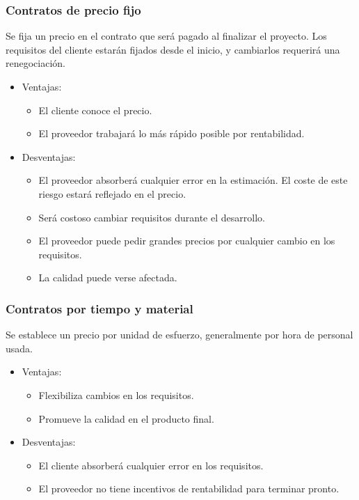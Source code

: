\documentclass[12pt]{article}
\begin{document}
\subsubsection{Contratos de precio fijo}
\label{10.2.1}

{Se fija un precio en el contrato que será pagado al finalizar el proyecto. Los requisitos del cliente estarán fijados desde el inicio, y cambiarlos requerirá una renegociación.}

\begin{itemize}
    \item Ventajas:
    
    \begin{itemize}
        \item El cliente conoce el precio.
        \item El proveedor trabajará lo más rápido posible por rentabilidad.
    \end{itemize}
    
    \item Desventajas:
    
    \begin{itemize}
        \item El proveedor absorberá cualquier error en la estimación. El coste de este riesgo estará reflejado en el precio.
        \item Será costoso cambiar requisitos durante el desarrollo.
        \item El proveedor puede pedir grandes precios por cualquier cambio en los requisitos.
        \item La calidad puede verse afectada.
    \end{itemize}
    
\end{itemize}

\subsubsection{Contratos por tiempo y material}
\label{10.2.2}

{Se establece un precio por unidad de esfuerzo, generalmente por hora de personal usada.}

\begin{itemize}
    \item Ventajas:
    
    \begin{itemize}
        \item Flexibiliza cambios en los requisitos.
        \item Promueve la calidad en el producto final.
    \end{itemize}
    
    \item Desventajas:
    
    \begin{itemize}
        \item El cliente absorberá cualquier error en los requisitos.
        \item El proveedor no tiene incentivos de rentabilidad para terminar pronto.
    \end{itemize}
    
\end{itemize}
\end{document}
